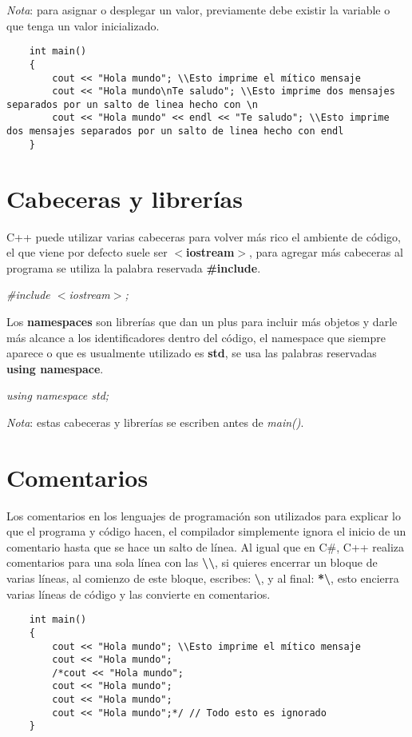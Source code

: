 \textit{Nota}: para asignar o desplegar un valor, previamente debe existir la variable o que tenga un valor inicializado.
\begin{lstlisting}
    int main()
    {
        cout << "Hola mundo"; \\Esto imprime el mítico mensaje
        cout << "Hola mundo\nTe saludo"; \\Esto imprime dos mensajes separados por un salto de linea hecho con \n
        cout << "Hola mundo" << endl << "Te saludo"; \\Esto imprime dos mensajes separados por un salto de linea hecho con endl
    }
\end{lstlisting}



\section{Cabeceras y librerías}
\hspace{0.55cm}C++ puede utilizar varias cabeceras para volver más rico el ambiente de código, el que viene por defecto suele ser \textbf{$<$iostream$>$}, para agregar más cabeceras al programa se utiliza la palabra reservada \textbf{\#include}.
\begin{center}
    \textit{\#include $<$iostream$>$;}
\end{center}

Los \textbf{namespaces} son librerías que dan un plus para incluir más objetos y darle más alcance a los identificadores dentro del código, el namespace que siempre aparece o que es usualmente utilizado es \textbf{std}, se usa las palabras reservadas \textbf{using namespace}.
\begin{center}
    \textit{using namespace std;}
\end{center}

\textit{Nota}: estas cabeceras y librerías se escriben antes de \textit{main()}.



\section{Comentarios}
\hspace{0.55cm}Los comentarios en los lenguajes de programación son utilizados para explicar lo que el programa y código hacen, el compilador simplemente ignora el inicio de un comentario hasta que se hace un salto de línea. Al igual que en C\#, C++ realiza comentarios para una sola línea con las \textbf{\textbackslash\textbackslash}, si quieres encerrar un bloque de varias líneas, al comienzo de este bloque, escribes: \textbf{\textbackslash*}, y al final: \textbf{*\textbackslash}, esto encierra varias líneas de código y las convierte en comentarios.
\begin{lstlisting}
    int main()
    {
        cout << "Hola mundo"; \\Esto imprime el mítico mensaje
        cout << "Hola mundo";
        /*cout << "Hola mundo";
        cout << "Hola mundo";
        cout << "Hola mundo";
        cout << "Hola mundo";*/ // Todo esto es ignorado
    }
\end{lstlisting}



